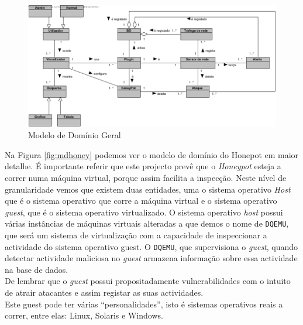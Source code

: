 \begin{figure}[!ht]
\centering	
\includegraphics[scale=0.7]{images/ModelosDeDominio/Geral.png}
\caption{Modelo de Domínio Geral}
\label{fig:mdgeral}
\end{figure}
\pagebreak
Na Figura \ref{fig:mdhoney} podemos ver o modelo de domínio do Honepot em maior detalhe. É importante referir que este projecto
prevê que o \emph{Honeypot} esteja a correr numa máquina virtual, porque assim facilita a inspecção. Neste nível de granularidade vemos que existem duas entidades,
uma o sistema operativo \emph{Host} que é o sistema operativo que corre a máquina virtual e o sistema operativo \emph{guest}, que é o sistema operativo virtualizado.
O sistema operativo \emph{host} possui várias instâncias de máquinas virtuais alteradas a que demos o nome de \texttt{DQEMU}, que será um sistema de virtualização
com a capacidade de inspeccionar a actividade do sistema operativo guest. O \texttt{DQEMU}, que supervisiona o \emph{guest}, quando detectar actividade maliciosa no \emph{guest} armazena informação sobre essa actividade na base de dados.\\
De lembrar que o \emph{guest} possui propositadamente vulnerabilidades com o intuito de atrair atacantes e assim registar as suas actividades.\\
Este guest pode ter várias ``personalidades'', isto é sistemas operativos reais a correr, entre elas: Linux, Solaris e Windows.

